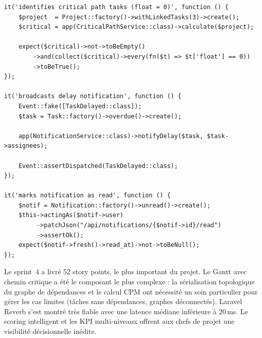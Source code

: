 \begin{lstlisting}[style=phpstyle,caption={Tests unitaires — CPM et notifications},label={lst:tests_s4}]
it('identifies critical path tasks (float = 0)', function () {
    $project  = Project::factory()->withLinkedTasks(3)->create();
    $critical = app(CriticalPathService::class)->calculate($project);

    expect($critical)->not->toBeEmpty()
        ->and(collect($critical)->every(fn($t) => $t['float'] == 0))
        ->toBeTrue();
});

it('broadcasts delay notification', function () {
    Event::fake([TaskDelayed::class]);
    $task = Task::factory()->overdue()->create();

    app(NotificationService::class)->notifyDelay($task, $task->assignees);

    Event::assertDispatched(TaskDelayed::class);
});

it('marks notification as read', function () {
    $notif = Notification::factory()->unread()->create();
    $this->actingAs($notif->user)
         ->patchJson("/api/notifications/{$notif->id}/read")
         ->assertOk();
    expect($notif->fresh()->read_at)->not->toBeNull();
});
\end{lstlisting}

\begin{chapconclusion}
Le sprint~4 a livré 52 story points, le plus important du projet. Le Gantt avec
chemin critique a été le composant le plus complexe : la sérialisation topologique
du graphe de dépendances et le calcul CPM ont nécessité un soin particulier pour
gérer les cas limites (tâches sans dépendances, graphes déconnectés). Laravel Reverb
s'est montré très fiable avec une latence médiane inférieure à 20\,ms. Le scoring
intelligent et les KPI multi-niveaux offrent aux chefs de projet une visibilité
décisionnelle inédite.
\end{chapconclusion}
